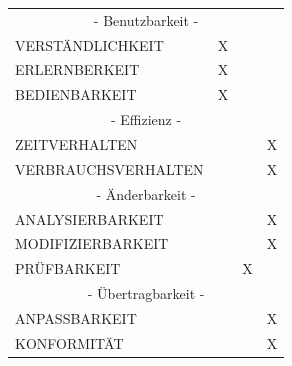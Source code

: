 \documentclass[a4paper]{scrreprt}
\begin{document}
\begin{table}[h!]
\begin{tabular}{llll}
    			\multicolumn{4}{c}{- Benutzbarkeit -}\\
    			VERSTÄNDLICHKEIT                             &                    X                    &                                   &                                      \\
    			ERLERNBERKEIT                                &                    X                    &                                   &                                      \\
    			BEDIENBARKEIT                                &                    X                    &                                   &                                      \\
    			\multicolumn{4}{c}{- Effizienz -}\\
    			ZEITVERHALTEN                                &                                        &                                   &      \hspace{6mm}                 X                \\
    			VERBRAUCHSVERHALTEN                          &                                        &                                   &      \hspace{6mm}                 X                \\
    			\multicolumn{4}{c}{- Änderbarkeit -}\\
    			ANALYSIERBARKEIT                             &                                        &                                   &       \hspace{6mm}                X                \\
    			MODIFIZIERBARKEIT                            &                                        &                                   &        \hspace{6mm}               X                \\
    			PRÜFBARKEIT                                  &                                        &     \hspace{6mm}                 X               &                                     \\
    			\multicolumn{4}{c}{- Übertragbarkeit -}\\
    			ANPASSBARKEIT                                &                                        &                                   &        \hspace{6mm}               X                \\
    			KONFORMITÄT                                  &                                        &                                   &        \hspace{6mm}               X             \\  
    		\end{tabular}
    	\end{table}
\end{document}
